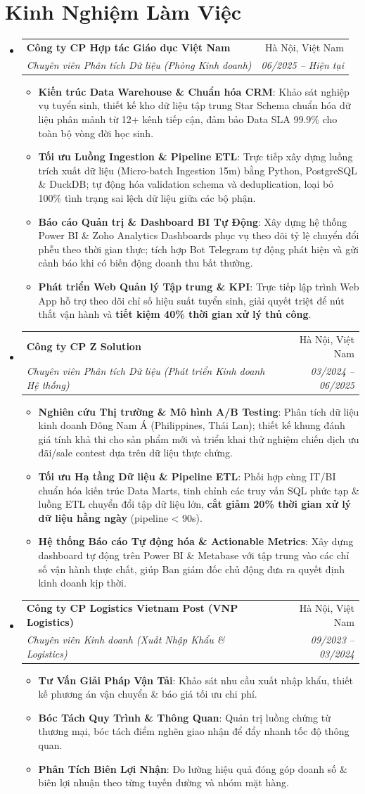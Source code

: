 \documentclass[letterpaper,11pt]{article}
\makeatletter
\newcommand{\resumeItem}[1]{
  \item\small{
    {#1 \vspace{1pt}}
  }
}
\newcommand{\resumeSubheading}[4]{
  \vspace{2pt}\item
    \begin{tabular*}{\textwidth}[t]{l@{\extracolsep{\fill}}r}
      \textbf{#1} & #2 \\
      \textit{\small#3} & \textit{\small #4} \\
    \end{tabular*}\vspace{-2pt}
}
\newcommand{\resumeSubHeadingListStart}{\begin{itemize}[leftmargin=0.15in, label={}]}
\newcommand{\resumeSubHeadingListEnd}{\end{itemize}}
\newcommand{\resumeItemListStart}{\begin{itemize}[leftmargin=0.15in, itemsep=2.5pt, topsep=2pt, parsep=1.5pt]}
\newcommand{\resumeItemListEnd}{\end{itemize}\vspace{2pt}}
\makeatother
\begin{document}
\section*{Kinh Nghiệm Làm Việc}
  \resumeSubHeadingListStart
        \resumeSubheading
      {Công ty CP Hợp tác Giáo dục Việt Nam}{Hà Nội, Việt Nam}
      {Chuyên viên Phân tích Dữ liệu (Phòng Kinh doanh)}{06/2025 -- Hiện tại}
      \resumeItemListStart
      \resumeItem{\textbf{Kiến trúc Data Warehouse \& Chuẩn hóa CRM}: Khảo sát nghiệp vụ tuyển sinh, thiết kế kho dữ liệu tập trung Star Schema chuẩn hóa dữ liệu phân mảnh từ 12+ kênh tiếp cận, đảm bảo Data SLA 99.9\% cho toàn bộ vòng đời học sinh.}
      \resumeItem{\textbf{Tối ưu Luồng Ingestion \& Pipeline ETL}: Trực tiếp xây dựng luồng trích xuất dữ liệu (Micro-batch Ingestion 15m) bằng Python, PostgreSQL \& DuckDB; tự động hóa validation schema và deduplication, loại bỏ 100\% tình trạng sai lệch dữ liệu giữa các bộ phận.}
      \resumeItem{\textbf{Báo cáo Quản trị \& Dashboard BI Tự Động}: Xây dựng hệ thống Power BI \& Zoho Analytics Dashboards phục vụ theo dõi tỷ lệ chuyển đổi phễu theo thời gian thực; tích hợp Bot Telegram tự động phát hiện và gửi cảnh báo khi có biến động doanh thu bất thường.}
      \resumeItem{\textbf{Phát triển Web Quản lý Tập trung \& KPI}: Trực tiếp lập trình Web App hỗ trợ theo dõi chỉ số hiệu suất tuyển sinh, giải quyết triệt để nút thắt vận hành và \textbf{tiết kiệm 40\% thời gian xử lý thủ công}.}
      \resumeItemListEnd
    \resumeSubheading
      {Công ty CP Z Solution}{Hà Nội, Việt Nam}
      {Chuyên viên Phân tích Dữ liệu (Phát triển Kinh doanh Hệ thống)}{03/2024 -- 06/2025}
      \resumeItemListStart
      \resumeItem{\textbf{Nghiên cứu Thị trường \& Mô hình A/B Testing}: Phân tích dữ liệu kinh doanh Đông Nam Á (Philippines, Thái Lan); thiết kế khung đánh giá tính khả thi cho sản phẩm mới và triển khai thử nghiệm chiến dịch ưu đãi/sale contest dựa trên dữ liệu thực chứng.}
      \resumeItem{\textbf{Tối ưu Hạ tầng Dữ liệu \& Pipeline ETL}: Phối hợp cùng IT/BI chuẩn hóa kiến trúc Data Marts, tinh chỉnh các truy vấn SQL phức tạp \& luồng ETL chuyển đổi tập dữ liệu lớn, \textbf{cắt giảm 20\% thời gian xử lý dữ liệu hằng ngày} (pipeline < 90s).}
      \resumeItem{\textbf{Hệ thống Báo cáo Tự động hóa \& Actionable Metrics}: Xây dựng dashboard tự động trên Power BI \& Metabase với tập trung vào các chỉ số vận hành thực chất, giúp Ban giám đốc chủ động đưa ra quyết định kinh doanh kịp thời.}
      \resumeItemListEnd
    \resumeSubheading
      {Công ty CP Logistics Vietnam Post (VNP Logistics)}{Hà Nội, Việt Nam}
      {Chuyên viên Kinh doanh (Xuất Nhập Khẩu \& Logistics)}{09/2023 -- 03/2024}
      \resumeItemListStart
      \resumeItem{\textbf{Tư Vấn Giải Pháp Vận Tải}: Khảo sát nhu cầu xuất nhập khẩu, thiết kế phương án vận chuyển \& báo giá tối ưu chi phí.}
      \resumeItem{\textbf{Bóc Tách Quy Trình \& Thông Quan}: Quản trị luồng chứng từ thương mại, bóc tách điểm nghẽn giao nhận để đẩy nhanh tốc độ thông quan.}
      \resumeItem{\textbf{Phân Tích Biên Lợi Nhận}: Đo lường hiệu quả đóng góp doanh số \& biên lợi nhuận theo từng tuyến đường và nhóm mặt hàng.}
      \resumeItemListEnd
  \resumeSubHeadingListEnd
\end{document}
